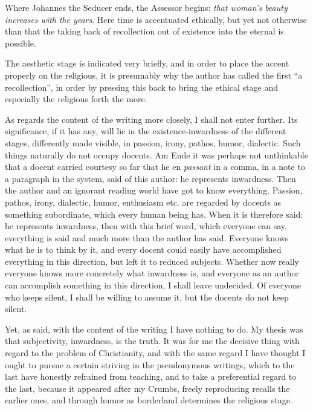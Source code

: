 \documentclass[12pt,a4paper,openany]{book}
\newcommand{\opage}[1]{\marginnote{\footnotesize\textit{[#1]}}}
\begin{document}
Where Johannes the Seducer ends, the Assessor begins:
\emph{that woman's beauty increases with}
\emph{the years}. Here time is accentuated ethically, but yet not otherwise than that
the taking back of recollection out of existence into the eternal is possible.

The aesthetic stage is indicated very briefly, and in order to place the accent properly
on the religious, it is presumably why the author has called the first ``a
recollection'', in order by pressing this back to bring the ethical stage and
especially the religious forth the more.

As regards the content of the writing more closely, I shall not enter further. Its
significance, if it has any, will lie in the existence-inwardness of the different
stages, differently made visible, in passion, irony, pathos, humor, dialectic. Such
things naturally do not occupy docents. Am Ende it was perhaps not unthinkable that a
docent carried
\setcounter{footnote}{0}%
\opage{198}courtesy so far that he en \textit{passant} in a comma, in a note to a paragraph
in the system, said of this author: he represents inwardness. Then the author and an
ignorant reading world have got to know everything. Passion, pathos, irony, dialectic,
humor, enthusiasm etc. are regarded by docents as something subordinate, which every
human being has. When it is therefore said: he represents inwardness, then with this
brief word, which everyone can say, everything is said and much more than the author
has said. Everyone knows what he is to think by it, and every docent could easily have
accomplished everything in this direction, but left it to reduced subjects. Whether now
really everyone knows more concretely what inwardness is, and everyone as an author
can accomplish something in this direction, I shall leave undecided. Of everyone who
keeps silent, I shall be willing to assume it, but the docents do not keep silent.

Yet, as said, with the content of the writing I have nothing to do. My thesis was that
subjectivity, inwardness, is the truth. It was for me the decisive thing with regard
to the problem of Christianity, and with the same regard I have thought I ought to
pursue a certain striving in the pseudonymous writings, which to the last have honestly
refrained from teaching, and to take a preferential regard to the last, because it
appeared after my Crumbs, freely reproducing recalls the earlier ones, and through
humor as borderland determines the religious stage.
\end{document}
